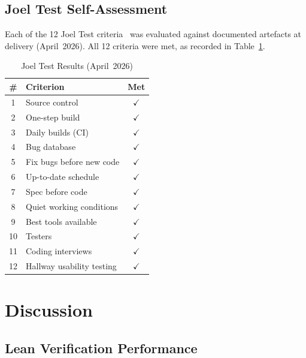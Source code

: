 \documentclass[conference]{IEEEtran}
\begin{document}
\subsection{Joel Test Self-Assessment}
\label{subsec:joel}

Each of the 12 Joel Test criteria~\cite{ref:spolsky} was evaluated against
documented artefacts at delivery (April~2026). All 12 criteria were met,
as recorded in Table~\ref{tab:joel}.

\begin{table}[htbp]
  \caption{Joel Test Results (April~2026)}
  \label{tab:joel}
  \centering
  \begin{tabular}{clc}
    \hline
    \textbf{\#} & \textbf{Criterion} & \textbf{Met} \\
    \hline
    1  & Source control              & $\checkmark$ \\
    2  & One-step build              & $\checkmark$ \\
    3  & Daily builds (CI)           & $\checkmark$ \\
    4  & Bug database                & $\checkmark$ \\
    5  & Fix bugs before new code    & $\checkmark$ \\
    6  & Up-to-date schedule         & $\checkmark$ \\
    7  & Spec before code            & $\checkmark$ \\
    8  & Quiet working conditions    & $\checkmark$ \\
    9  & Best tools available        & $\checkmark$ \\
    10 & Testers                     & $\checkmark$ \\
    11 & Coding interviews           & $\checkmark$ \\
    12 & Hallway usability testing   & $\checkmark$ \\
    \hline
  \end{tabular}
\end{table}

\section{Discussion}
\label{sec:discussion}

\subsection{Lean Verification Performance}
\label{subsec:disc-lean}
\end{document}
